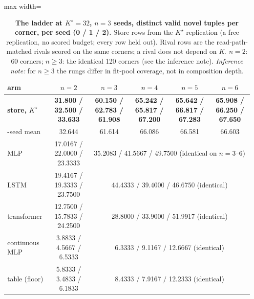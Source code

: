 \documentclass{article} %
\newcommand{\Kstar}{\ensuremath{K^{\star}}}
\begin{document}
\begin{table}[t]
\centering\small
\caption{\textbf{The ladder at $\Kstar=32$, $n=3$ seeds, distinct valid novel tuples per %
corner, per seed (0 / 1 / 2).} Store rows from the $\Kstar$ replication (a free replication,
no scored budget; every row held out). Rival rows are the read-path-matched rivals scored on
the same corners; a rival does not depend on $K$. $n=2$: 60 corners; $n\ge3$: the identical %
120 corners (see the inference note). \emph{Inference note:} for $n\ge3$ the rungs differ in %
fit-pool coverage, not in composition depth.}
\label{tab:ladder}
\setlength{\tabcolsep}{2.6pt}
\begin{adjustbox}{max width=\linewidth}\begin{tabular}{lccccc}
\toprule
arm & $n=2$ & $n=3$ & $n=4$ & $n=5$ & $n=6$ \\
\midrule
\textbf{store, $\Kstar$} & \textbf{31.800 / 32.500 / 33.633} & \textbf{60.150 / 62.783 / 61.908} & \textbf{65.242 / 65.817 / 67.200} & \textbf{65.642 / 66.817 / 67.283} & \textbf{65.908 / 66.250 / 67.650} \\
\quad 3-seed mean & 32.644 & 61.614 & 66.086 & 66.581 & 66.603 \\
MLP & 17.0167 / 22.0000 / 23.3333 & \multicolumn{4}{c}{35.2083 / 41.5667 / 49.7500 (identical on $n=3$--$6$)} \\
LSTM & 19.4167 / 19.3333 / 23.7500 & \multicolumn{4}{c}{44.4333 / 39.4000 / 46.6750 (identical)} \\
transformer & 12.7500 / 15.7833 / 24.2500 & \multicolumn{4}{c}{28.8000 / 33.9000 / 51.9917 (identical)} \\
continuous MLP & 3.8833 / 4.5667 / 6.5333 & \multicolumn{4}{c}{6.3333 / 9.1167 / 12.6667 (identical)} \\
table (floor) & 5.8333 / 3.4833 / 6.1833 & \multicolumn{4}{c}{8.4333 / 7.9167 / 12.2333 (identical)} \\
\bottomrule
\end{tabular}\end{adjustbox}
\end{table}
\end{document}
